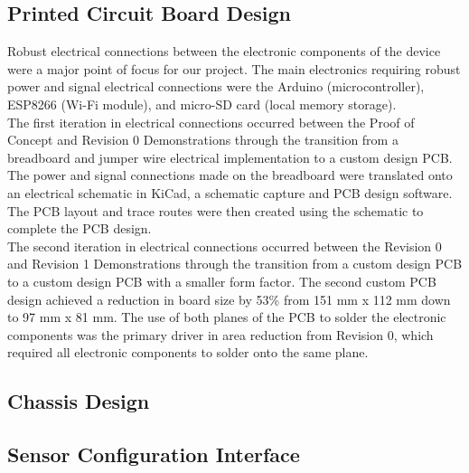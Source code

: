 \documentclass{article}
\begin{document}

\subsection{Printed Circuit Board Design}
Robust electrical connections between the electronic components of the device were a major point of focus for our project. The main electronics requiring robust power and signal electrical connections were the Arduino (microcontroller), ESP8266 (Wi-Fi module), and micro-SD card (local memory storage). \\

The first iteration in electrical connections occurred between the Proof of Concept and Revision 0 Demonstrations through the transition from a breadboard and jumper wire electrical implementation to a custom design PCB. The power and signal connections made on the breadboard were translated onto an electrical schematic in KiCad, a schematic capture and PCB design software. The PCB layout and trace routes were then created using the schematic to complete the PCB design. \\

The second iteration in electrical connections occurred between the Revision 0 and Revision 1 Demonstrations through the transition from a custom design PCB to a custom design PCB with a smaller form factor. The second custom PCB design achieved a reduction in board size by 53\% from 151 mm x 112 mm down to 97 mm x 81 mm. The use of both planes of the PCB to solder the electronic components was the primary driver in area reduction from Revision 0, which required all electronic components to solder onto the same plane. \\

\subsection{Chassis Design}

\subsection{Sensor Configuration Interface}
\end{document}
